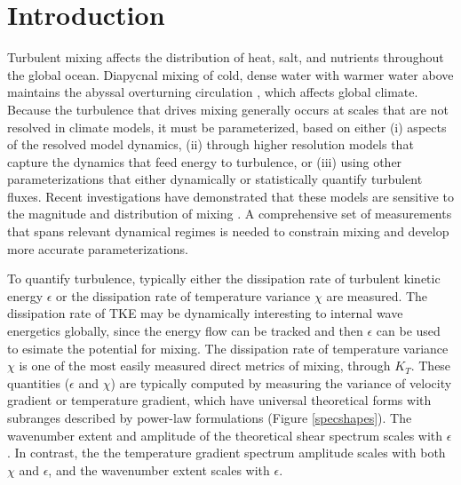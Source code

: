 \documentclass{ametsoc}
\begin{document}


\section{Introduction}

Turbulent mixing affects the distribution of heat, salt, and nutrients throughout the global ocean. Diapycnal mixing  of cold, dense water with warmer water above maintains the abyssal overturning circulation \citep{munk66,munkwunsch98}, which affects global climate. Because the turbulence that drives mixing generally occurs at scales that are not resolved in climate models, it must be parameterized, based on either (i) aspects of the resolved model dynamics, (ii) through higher resolution models that capture the dynamics that feed energy to turbulence, or (iii) using other parameterizations that either dynamically or statistically quantify turbulent fluxes. Recent investigations have demonstrated that these models are sensitive to the magnitude and distribution of mixing \citep{meletetal13}. A comprehensive set of measurements that spans relevant dynamical regimes is needed to constrain mixing and develop more accurate parameterizations.

To quantify turbulence, typically either the dissipation rate of turbulent kinetic energy $\epsilon$ or the dissipation rate of temperature variance $\chi$ are measured. The dissipation rate of TKE may be dynamically interesting to internal wave energetics globally, since the energy flow can be tracked and then $\epsilon$ can be used to esimate the potential for mixing. The dissipation rate of temperature variance $\chi$ is one of the most easily measured direct metrics of mixing, through $K_T$. These quantities ($\epsilon$ and $\chi$) are typically computed by measuring the variance of velocity gradient or temperature gradient, which have universal theoretical forms with subranges described by power-law formulations (Figure \ref{specshapes}). The wavenumber extent and amplitude of the theoretical shear spectrum scales with $\epsilon$. In contrast, the the temperature gradient spectrum amplitude scales with both $\chi$ and $\epsilon$, and the wavenumber extent scales with $\epsilon$.
\end{document}
